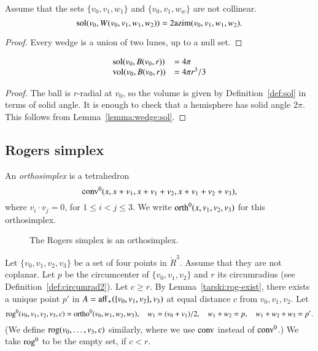 \begin{lemma} 
Assume that the sets $\{v_0,v_1,w_1\}$ and
$\{v_0,v_1,w_w\}$ are not collinear. 
$$\operatorname{sol}(v_0,W(v_0,v_1,w_1,w_2)) = 2{\operatorname{azim}}(v_0,v_1,w_1,w_2).$$
\end{lemma}    

\begin{proof} Every wedge is a union of two lunes, up to a null set.
\end{proof}

\begin{lemma}  
   $$
   \begin{array}{lll}
    {\operatorname{sol}}(v_0,B(v_0,r)) &= 4\pi\\
    {\operatorname{vol}}(v_0,B(v_0,r)) &= 4\pi r^3/3\\
   \end{array}
   $$
\end{lemma}

\begin{proof}
The ball is $r$-radial at $v_0$, so the volume is given by
Definition~\ref{def:sol} in terms of solid angle.  It is enough
to check that a hemisphere has solid angle $2\pi$.  This follows
from Lemma~\ref{lemma:wedge:sol}.
\end{proof}  




\subsection{Rogers simplex}

\begin{definition} 
An {\it orthosimplex} is a tetrahedron
    $${\operatorname{conv}}^0(x,x+v_1,x+v_1+v_2,x+v_1+v_2+v_3),$$
where $v_i\cdot v_j=0$, for $1\le i<j\le 3$.   We write
${\operatorname{orth}}^0(x,v_1,v_2,v_3)$ for this orthosimplex.
\end{definition}

\begin{figure}[htb]
  \centering
  \caption{The Rogers simplex is an orthosimplex.}
\end{figure}


\begin{definition} 
Let $\{v_0,v_1,v_2,v_3\}$ be a set of four points in $\ring{R}^3$.
Assume that they are not coplanar.  Let $p$ be the circumcenter
of $\{v_0,v_1,v_2\}$ and $r$ its circumradius (see Definition~\ref{def:circumrad2}).  Let $c\ge r$.
By Lemma~\ref{tarski:rog-exist}, there exists a unique
point $p'$ in $A={\operatorname{aff}}_+(\{v_0,v_1,v_2\},v_3)$ at equal distance $c$
from $v_0,v_1,v_2$.
Let $$
    {\operatorname{rog}}^0(v_0,v_1,v_2,v_3,c) = 
    {\operatorname{ortho}}^0(v_0,w_1,w_2,w_3),
    \quad w_1=(v_0+v_1)/2,\quad w_1+w_2=p,\quad w_1+w_2+w_3=p'.
    $$
(We define ${\operatorname{rog}}(v_0,\ldots,v_3,c)$ similarly, where we use
${\operatorname{conv}}$ instead of ${\operatorname{conv}}^0$.)
We take ${\operatorname{rog}}^0$ to be the empty set, if $c< r$.
\end{definition}



